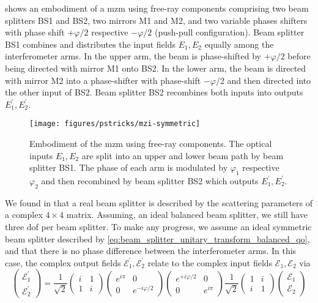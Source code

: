  shows an embodiment of a \gls{mzm} using free-ray components comprising two beam splitters BS1 and BS2, two mirrors M1 and M2, and two variable phases shifters with phase shift $+\varphi/2$ respective $-\varphi/2$ (push-pull configuration).
Beam splitter BS1 combines and distributes the input fields $E_1,E_2$ equally among the interferometer arms.
In the upper arm, the beam is phase-shifted by $+\varphi/2$ before being directed with mirror M1 onto BS2.
In the lower arm, the beam is directed with mirror M2 into a phase-shifter with phase-shift $-\varphi/2$ and then directed into the other input of BS2.
Beam splitter BS2 recombines both inputs into outputs $E_1^\prime,E_2^\prime$.
\begin{figure}[htb]
    \centering
    \texttt{[image: figures/pstricks/mzi-symmetric]}
    \caption{Embodiment of the \gls{mzm} using free-ray components. The optical inputs $E_1,E_2$ are split into an upper and lower beam path by beam splitter BS1. The phase of each arm is modulated by $\varphi_1$ respective $\varphi_2$ and then recombined by beam splitter BS2 which outputs $E_1^\prime,E_2^\prime$.}\label{fig:mach_zehnder_modulator}
\end{figure}
We found in  that a real beam splitter is described by the scattering parameters of a complex $4\times 4$ matrix.
Assuming, an ideal balanced beam splitter, we still have three \gls{dof} per beam splitter.
To make any progress, we assume an ideal symmetric beam splitter described by \cref{eq:beam_splitter_unitary_transform_balanced_qo}, and that there is no phase difference between the interferometer arms.
In this case, the complex output fields $\mathcal{E}_1^\prime,\mathcal{E}_2^\prime$ relate to the complex input fields $\mathcal{E}_1,\mathcal{E}_2$ via
\begin{equation}
    \begin{pmatrix}
        \mathcal{E}_1^\prime
        \\
        \mathcal{E}_2^\prime
    \end{pmatrix}
    =
    \frac{1}{\sqrt{2}}
    \begin{pmatrix}
        i & 1
        \\
        1 & i
    \end{pmatrix}
    \begin{pmatrix}
        e^{i\pi} & 0
        \\
        0 & e^{-i\varphi/2}
    \end{pmatrix}
        \begin{pmatrix}
        e^{+i\varphi/2} & 0
        \\
        0 & e^{i\pi}
    \end{pmatrix}
    \frac{1}{\sqrt{2}}
    \begin{pmatrix}
        1 & i
        \\
        i & 1
    \end{pmatrix}
    \begin{pmatrix}
        \mathcal{E}_1
        \\
        \mathcal{E}_2
    \end{pmatrix}
    \label{eq:mzm_transform}
\end{equation}
